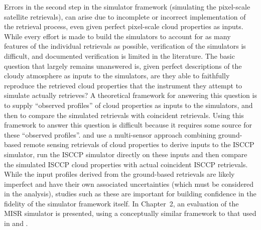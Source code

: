 Errors in the second step in the simulator framework (simulating the
pixel-scale satellite retrievals), can arise due to incomplete or
incorrect implementation of the retrieval process, even given perfect
pixel-scale cloud properties as inputs. While every effort is made to
build the simulators to account for as many features of the individual
retrievals as possible, verification of the simulators is difficult, and
documented verification is limited in the literature. The basic question
that largely remains unanswered is, given perfect descriptions of the
cloudy atmosphere as inputs to the simulators, are they able to
faithfully reproduce the retrieved cloud properties that the instrument
they attempt to simulate actually retrieves? A theoretical framework for
answering this question is to supply ``observed profiles'' of cloud
properties as inputs to the simulators, and then to compare the
simulated retrievals with coincident retrievals. Using this framework to
answer this question is difficult because it requires some source for
these ``observed profiles''. \citet{mace_et_al_2009} and
\citet{mace_et_al_2011} use a multi-sensor approach combining
ground-based remote sensing retrievals of cloud properties to derive
inputs to the ISCCP simulator, run the ISCCP simulator directly on these
inputs and then compare the simulated ISCCP cloud properties with actual
coincident ISCCP retrievals. While the input profiles derived from the
ground-based retrievals are likely imperfect and have their own
associated uncertainties (which must be considered in the analysis),
studies such as these are important for building confidence in the
fidelity of the simulator framework itself. In Chapter~2, an evaluation
of the MISR simulator is presented, using a conceptually similar
framework to that used in \citet{mace_et_al_2009} and
\citet{mace_et_al_2011}.
